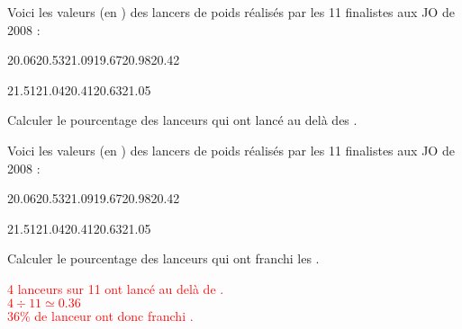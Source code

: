 \begin{exercice*}
    Voici les valeurs (en \Lg[m]{}) des lancers de poids réalisés par les 11 finalistes aux JO de 2008 :\par\smallskip
    \num{20.06}\hfill\num{20.53}\hfill\num{21.09}\hfill\num{19.67}\hfill\num{20.98}\hfill\num{20.42}\par\smallskip
    \num{21.51}\hfill\num{21.04}\hfill\num{20.41}\hfill\num{20.63}\hfill\num{21.05}\par\bigskip
    Calculer le pourcentage des lanceurs qui ont lancé au delà des .
\end{exercice*}
\begin{corrige}
    Voici les valeurs (en \Lg[m]{}) des lancers de poids réalisés par les 11 finalistes aux JO de 2008 :\par\smallskip
    \num{20.06}\hfill\num{20.53}\hfill\num{21.09}\hfill\num{19.67}\hfill\num{20.98}\hfill\num{20.42}\par\smallskip
    \num{21.51}\hfill\num{21.04}\hfill\num{20.41}\hfill\num{20.63}\hfill\num{21.05}\par\bigskip
    Calculer le pourcentage des lanceurs qui ont franchi les .
    \par\medskip
    \textcolor{red}{%
    4 lanceurs sur 11 ont lancé au delà de .\\
    $4\div 11 \simeq \num{0.36}$\\
    36\% de lanceur ont donc franchi .%
    }
\end{corrige}

